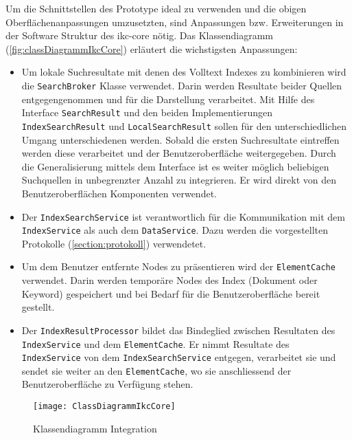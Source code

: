 Um die Schnittstellen des Prototype ideal zu verwenden und die obigen Oberflächenanpassungen umzusetzten, sind Anpassungen bzw. Erweiterungen in der Software Struktur des \gls{ikc-core} nötig. Das Klassendiagramm (\autoref{fig:classDiagrammIkcCore}) erläutert die wichstigsten Anpassungen:

\begin{itemize}
    \item Um lokale Suchresultate mit denen des Volltext Indexes zu kombinieren wird die \texttt{SearchBroker} Klasse verwendet. Darin werden Resultate beider Quellen entgegengenommen und für die Darstellung verarbeitet. Mit Hilfe des Interface \texttt{SearchResult} und den beiden Implementierungen \texttt{IndexSearchResult} und \texttt{LocalSearchResult} sollen für den unterschiedlichen Umgang unterschiedenen werden. Sobald die ersten Suchresultate eintreffen werden diese verarbeitet und der Benutzeroberfläche weitergegeben. Durch die Generalisierung mittels dem Interface ist es weiter möglich beliebigen Suchquellen in unbegrenzter Anzahl zu integrieren. Er wird direkt von den Benutzeroberflächen Komponenten verwendet. 
    \item Der \texttt{IndexSearchService} ist verantwortlich für die Kommunikation mit dem \texttt{IndexService} als auch dem \texttt{DataService}. Dazu werden die vorgestellten Protokolle (\autoref{section:protokoll}) verwendetet.
    \item Um  dem Benutzer entfernte Nodes zu präsentieren wird der \texttt{ElementCache} verwendet. Darin werden temporäre Nodes des Index (Dokument oder \gls{Keyword}) gespeichert und bei Bedarf für die Benutzeroberfläche bereit gestellt.
    \item Der \texttt{IndexResultProcessor} bildet das Bindeglied zwischen Resultaten des \texttt{IndexService} und dem \texttt{ElementCache}. Er nimmt Resultate des \texttt{IndexService} von dem \texttt{IndexSearchService} entgegen, verarbeitet sie und sendet sie weiter an den \texttt{ElementCache}, wo sie anschliessend der Benutzeroberfläche zu Verfügung stehen.

\end{itemize}


    \begin{figure}[H]
    \centering
    \texttt{[image: ClassDiagrammIkcCore]}
    \caption{Klassendiagramm Integration}
    \label{fig:classDiagrammIkcCore}
    \end{figure}

